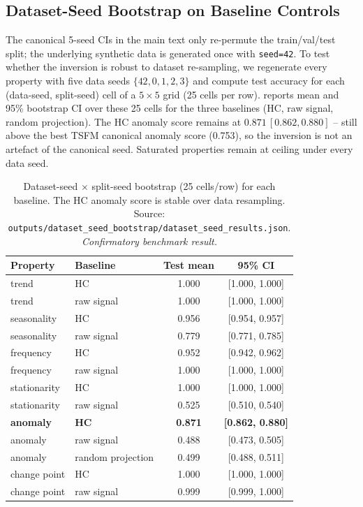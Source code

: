 \documentclass{article}
\begin{document}
\subsection{Dataset-Seed Bootstrap on Baseline Controls}
\label{sec:appendix_dataset_seed_bootstrap}

The canonical 5-seed CIs in the main text only re-permute the train/val/test split; the underlying synthetic data is generated once with \texttt{seed=42}. To test whether the inversion is robust to dataset re-sampling, we regenerate every property with five data seeds $\{42,0,1,2,3\}$ and compute test accuracy for each (data-seed, split-seed) cell of a $5\times 5$ grid (25 cells per row).  reports mean and 95\% bootstrap CI over these 25 cells for the three baselines (HC, raw signal, random projection). The HC anomaly score remains at $0.871\,[0.862,0.880]$ -- still above the best TSFM canonical anomaly score (0.753), so the inversion is not an artefact of the canonical seed. Saturated properties remain at ceiling under every data seed.

\begin{table}[htbp]
\caption{Dataset-seed $\times$ split-seed bootstrap (25 cells/row) for each baseline. The HC anomaly score is stable over data resampling. Source: \texttt{outputs/dataset\_seed\_bootstrap/dataset\_seed\_results.json}. \emph{Confirmatory benchmark result.}}
\label{tab:dataset_seed_bootstrap}
\centering
\small
\begin{tabular}{llcc}
\toprule
Property & Baseline & Test mean & 95\% CI \\
\midrule
trend         & HC                 & 1.000 & [1.000, 1.000] \\
trend         & raw signal         & 1.000 & [1.000, 1.000] \\
seasonality   & HC                 & 0.956 & [0.954, 0.957] \\
seasonality   & raw signal         & 0.779 & [0.771, 0.785] \\
frequency     & HC                 & 0.952 & [0.942, 0.962] \\
frequency     & raw signal         & 1.000 & [1.000, 1.000] \\
stationarity  & HC                 & 1.000 & [1.000, 1.000] \\
stationarity  & raw signal         & 0.525 & [0.510, 0.540] \\
\textbf{anomaly}       & \textbf{HC}                 & \textbf{0.871} & \textbf{[0.862, 0.880]} \\
anomaly       & raw signal         & 0.488 & [0.473, 0.505] \\
anomaly       & random projection  & 0.499 & [0.488, 0.511] \\
change point  & HC                 & 1.000 & [1.000, 1.000] \\
change point  & raw signal         & 0.999 & [0.999, 1.000] \\
\bottomrule
\end{tabular}
\end{table}
\end{document}
